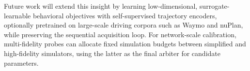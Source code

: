 \documentclass[conference]{IEEEtran}
\begin{document}
Future work will extend this insight by learning low-dimensional, surrogate-learnable behavioral objectives with self-supervised trajectory encoders, optionally pretrained on large-scale driving corpora such as Waymo and nuPlan, while preserving the sequential acquisition loop. For network-scale calibration, multi-fidelity probes can allocate fixed simulation budgets between simplified and high-fidelity simulators, using the latter as the final arbiter for candidate parameters.



\end{document}
